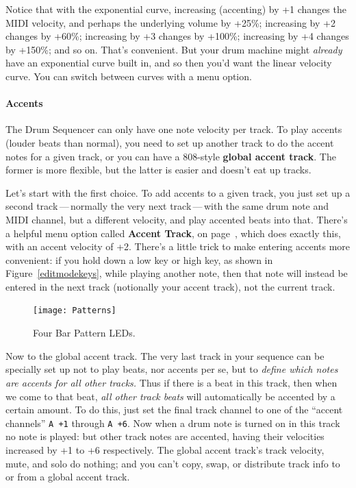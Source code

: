 \documentclass{article}
\begin{document}
Notice that with the exponential curve, increasing (accenting) by +1 changes the MIDI velocity, and perhaps the underlying volume by +25\%; increasing by +2 changes by +60\%; increasing by +3 changes by +100\%; increasing by +4 changes by +150\%; and so on.  That's convenient.  But your drum machine might {\it already} have an exponential curve built in, and so then you'd want the linear velocity curve.  You can switch between curves with a menu option.


\paragraph{Accents}  The Drum Sequencer can only have one note velocity per track.  To play accents (louder beats than normal), you need to set up another track to do the accent notes for a given track, or you can have a 808-style {\bf global accent track}.  The former is more flexible, but the latter is easier and doesn't eat up tracks.

Let's start with the first choice.  To add accents to a given track, you just set up a second track\,---\,normally the very next track\,---\,with the same drum note and MIDI channel, but a different velocity, and play accented beats into that.  There's a helpful menu option called {\bf Accent Track}, on page~\pageref*{accenttrack}, which does exactly this, with an accent velocity of +2.  There's a little trick to make entering accents more convenient: if you hold down a low key or high key, as shown in Figure~\ref{editmodekeys}, while playing another note, then that note will instead be entered in the next track (notionally your accent track), not the current track. 

\begin{figure}
\vspace{-1em}\hspace{\fill}\texttt{[image: Patterns]}\hspace{\fill}
\caption{\small Four Bar Pattern LEDs.}
\vspace{-2em}
\label{bars2}
\end{figure}

Now to the global accent track.  The very last track in your sequence can be specially set up not to play beats, nor accents per se, but to {\it define which notes are accents for all other tracks.}  Thus if there is a beat in this track, then when we come to that beat, {\it all other track beats} will automatically be accented by a certain amount.  To do this, just set the final track channel to one of the ``accent channels'' {\tt A +1} through {\tt A +6}.  Now when a drum note is turned on in this track no note is played: but other track notes are accented, having their velocities increased by +1 to +6 respectively.  The global accent track's track velocity, mute, and solo do nothing; and you can't copy, swap, or distribute track info to or from a global accent track.
\end{document}
